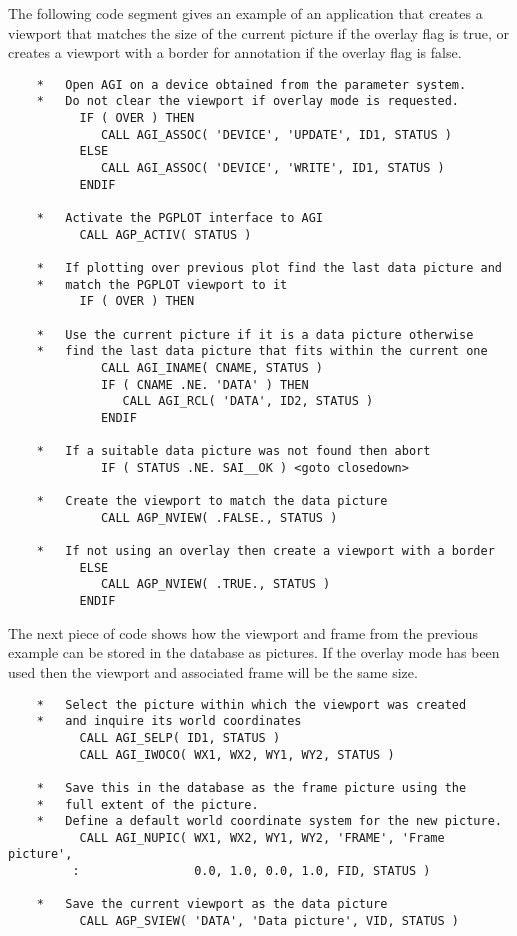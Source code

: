\documentclass[twoside,11pt]{article}
\renewcommand{\_}{\texttt{\symbol{95}}}
\begin{document}
The following code segment gives an example of an application that
creates a viewport that matches the size of the current picture if the
overlay flag is true, or creates a viewport with a border for annotation
if the overlay flag is false.
\begin{verbatim}
    *   Open AGI on a device obtained from the parameter system.
    *   Do not clear the viewport if overlay mode is requested.
          IF ( OVER ) THEN
             CALL AGI_ASSOC( 'DEVICE', 'UPDATE', ID1, STATUS )
          ELSE
             CALL AGI_ASSOC( 'DEVICE', 'WRITE', ID1, STATUS )
          ENDIF

    *   Activate the PGPLOT interface to AGI
          CALL AGP_ACTIV( STATUS )

    *   If plotting over previous plot find the last data picture and
    *   match the PGPLOT viewport to it
          IF ( OVER ) THEN

    *   Use the current picture if it is a data picture otherwise 
    *   find the last data picture that fits within the current one
             CALL AGI_INAME( CNAME, STATUS )
             IF ( CNAME .NE. 'DATA' ) THEN
                CALL AGI_RCL( 'DATA', ID2, STATUS )
             ENDIF

    *   If a suitable data picture was not found then abort
             IF ( STATUS .NE. SAI__OK ) <goto closedown>

    *   Create the viewport to match the data picture
             CALL AGP_NVIEW( .FALSE., STATUS )

    *   If not using an overlay then create a viewport with a border
          ELSE
             CALL AGP_NVIEW( .TRUE., STATUS )
          ENDIF
\end{verbatim}

The next piece of code shows how the viewport and frame from the previous
example can be stored in the database as pictures. If the overlay mode has
been used then the viewport and associated frame will be the same size.
\begin{verbatim}
    *   Select the picture within which the viewport was created
    *   and inquire its world coordinates
          CALL AGI_SELP( ID1, STATUS )
          CALL AGI_IWOCO( WX1, WX2, WY1, WY2, STATUS )

    *   Save this in the database as the frame picture using the
    *   full extent of the picture.
    *   Define a default world coordinate system for the new picture.
          CALL AGI_NUPIC( WX1, WX2, WY1, WY2, 'FRAME', 'Frame picture',
         :                0.0, 1.0, 0.0, 1.0, FID, STATUS )

    *   Save the current viewport as the data picture
          CALL AGP_SVIEW( 'DATA', 'Data picture', VID, STATUS )
\end{verbatim}
\end{document}
